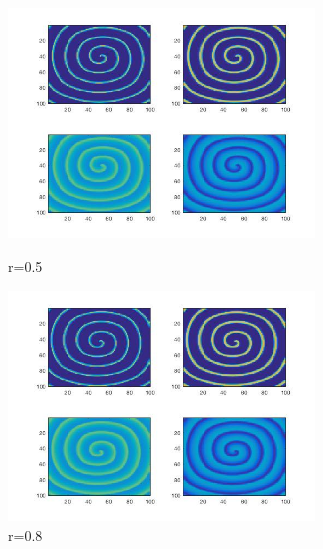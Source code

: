 \documentclass[
    bachelor,
    nofont, %
    pdflinks,
    ]{xjtuthesis}
\begin{document}
\begin{figure}
\begin{minipage}[!ht]{0.5\linewidth}
\centering
\includegraphics[width=3.2in]{p10r0_5_1.jpg}
\caption{r=0.5}
\end{minipage}%
\begin{minipage}[!ht]{0.5\linewidth}
\centering
\includegraphics[width=3.2in]{p10r0_8_1.jpg}
\caption{r=0.8}
\end{minipage}
\end{figure}
\end{document}
